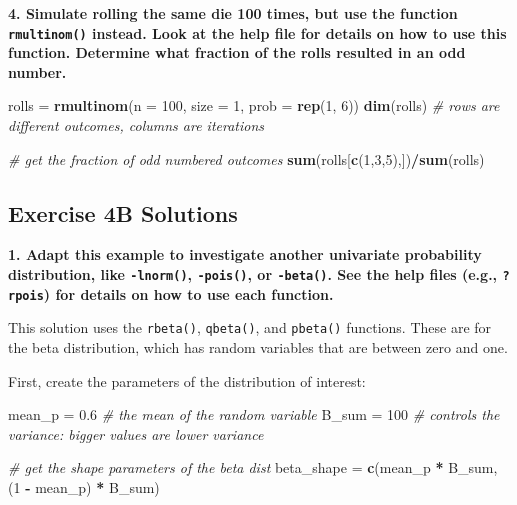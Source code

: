 \documentclass[]{book}
\newenvironment{Shaded}{\begin{snugshade}}{\end{snugshade}}
\newcommand{\KeywordTok}[1]{\textcolor[rgb]{0.13,0.29,0.53}{\textbf{#1}}}
\newcommand{\DataTypeTok}[1]{\textcolor[rgb]{0.13,0.29,0.53}{#1}}
\newcommand{\DecValTok}[1]{\textcolor[rgb]{0.00,0.00,0.81}{#1}}
\newcommand{\FloatTok}[1]{\textcolor[rgb]{0.00,0.00,0.81}{#1}}
\newcommand{\StringTok}[1]{\textcolor[rgb]{0.31,0.60,0.02}{#1}}
\newcommand{\CommentTok}[1]{\textcolor[rgb]{0.56,0.35,0.01}{\textit{#1}}}
\newcommand{\OperatorTok}[1]{\textcolor[rgb]{0.81,0.36,0.00}{\textbf{#1}}}
\newcommand{\NormalTok}[1]{#1}
\theoremstyle{definition}
\theoremstyle{definition}
\theoremstyle{definition}
\theoremstyle{remark}
\begin{document}
\textbf{4. Simulate rolling the same die 100 times, but use the function
\texttt{rmultinom()} instead. Look at the help file for details on how
to use this function. Determine what fraction of the rolls resulted in
an odd number.}

\begin{Shaded}
\begin{Highlighting}[]
\NormalTok{rolls =}\StringTok{ }\KeywordTok{rmultinom}\NormalTok{(}\DataTypeTok{n =} \DecValTok{100}\NormalTok{, }\DataTypeTok{size =} \DecValTok{1}\NormalTok{, }\DataTypeTok{prob =} \KeywordTok{rep}\NormalTok{(}\DecValTok{1}\NormalTok{, }\DecValTok{6}\NormalTok{))}
\KeywordTok{dim}\NormalTok{(rolls) }\CommentTok{#  rows are different outcomes, columns are iterations}

\CommentTok{# get the fraction of odd numbered outcomes}
\KeywordTok{sum}\NormalTok{(rolls[}\KeywordTok{c}\NormalTok{(}\DecValTok{1}\NormalTok{,}\DecValTok{3}\NormalTok{,}\DecValTok{5}\NormalTok{),])}\OperatorTok{/}\KeywordTok{sum}\NormalTok{(rolls)}
\end{Highlighting}
\end{Shaded}

\hypertarget{ex4b-answers}{\subsection*{Exercise 4B
Solutions}\label{ex4b-answers}}

\textbf{1. Adapt this example to investigate another univariate
probability distribution, like \texttt{-lnorm()}, \texttt{-pois()}, or
\texttt{-beta()}. See the help files (e.g., \texttt{?rpois}) for details
on how to use each function.}

This solution uses the \texttt{rbeta()}, \texttt{qbeta()}, and
\texttt{pbeta()} functions. These are for the beta distribution, which
has random variables that are between zero and one.

First, create the parameters of the distribution of interest:

\begin{Shaded}
\begin{Highlighting}[]
\NormalTok{mean_p =}\StringTok{ }\FloatTok{0.6}  \CommentTok{# the mean of the random variable}
\NormalTok{B_sum =}\StringTok{ }\DecValTok{100}   \CommentTok{# controls the variance: bigger values are lower variance}

\CommentTok{# get the shape parameters of the beta dist}
\NormalTok{beta_shape =}\StringTok{ }\KeywordTok{c}\NormalTok{(mean_p }\OperatorTok{*}\StringTok{ }\NormalTok{B_sum, (}\DecValTok{1} \OperatorTok{-}\StringTok{ }\NormalTok{mean_p) }\OperatorTok{*}\StringTok{ }\NormalTok{B_sum)}
\end{Highlighting}
\end{Shaded}
\end{document}
